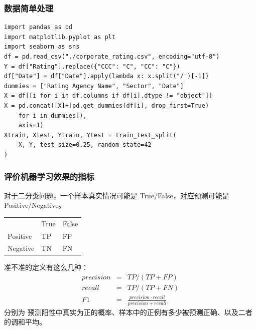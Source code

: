 \documentclass{ctexbeamer}
\begin{document}
\begin{frame}[fragile]
    \frametitle{数据简单处理}
    \begin{verbatim}
import pandas as pd
import matplotlib.pyplot as plt
import seaborn as sns
df = pd.read_csv("./corporate_rating.csv", encoding="utf-8")
Y = df["Rating"].replace({"CCC": "C", "CC": "C"})
df["Date"] = df["Date"].apply(lambda x: x.split("/")[-1])
dummies = ["Rating Agency Name", "Sector", "Date"]
X = df[[i for i in df.columns if df[i].dtype != "object"]]
X = pd.concat([X]+[pd.get_dummies(df[i], drop_first=True)
    for i in dummies]),
    axis=1)
Xtrain, Xtest, Ytrain, Ytest = train_test_split(
    X, Y, test_size=0.25, random_state=42
)
\end{verbatim}
\end{frame}
\begin{frame}
    \frametitle{评价机器学习效果的指标}
    对于二分类问题，一个样本真实情况可能是 True/False，对应预测可能是 Positive/Negative。
    \begin{center}
        \begin{tabular}{lll}
                     & True & False \\
            Positive & TP   & FP    \\
            Negative & TN   & FN    \\
        \end{tabular}
    \end{center}
    准不准的定义有这么几种：
    \begin{eqnarray}
        precision & = & TP / (TP + FP) \\
        recall & = & TP / (TP + FN) \nonumber\\
        F1 & = & \frac{precision\cdot recall}{precision+recall}\nonumber
    \end{eqnarray}
    分别为 预测阳性中真实为正的概率、样本中的正例有多少被预测正确、以及二者的调和平均。
\end{frame}
\end{document}
